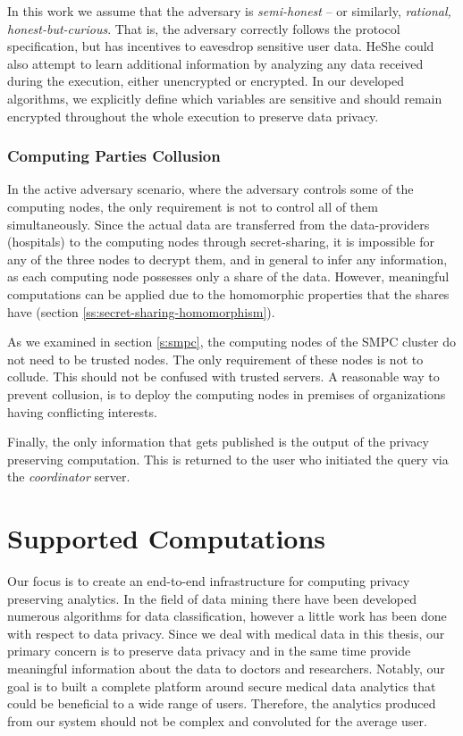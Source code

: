 In this work we assume that the adversary is \emph{semi\hyp honest} -- or similarly, \emph{rational, honest\hyp but\hyp curious}.
That is, the adversary correctly follows the protocol specification, but has incentives to eavesdrop sensitive user data.
He\myslash She could also attempt to learn additional information by analyzing any data received during the execution, either unencrypted or encrypted.
In our developed algorithms, we explicitly define which variables are sensitive and should remain encrypted throughout the whole execution to preserve data privacy.


\subsubsection{Computing Parties Collusion}\label{s:computing-parties-collusion}
In the active adversary scenario, where the adversary controls some of the computing nodes, the only requirement is not to control all of them simultaneously.
Since the actual data are transferred from the data-providers (hospitals) to the computing nodes through secret\hyp sharing, it is impossible for any of the three nodes to decrypt them, and in general to infer any information, as each computing node possesses only a share of the data.
However, meaningful computations can be applied due to the homomorphic properties that the shares have (section \ref{ss:secret-sharing-homomorphism}).

As we examined in section \ref{s:smpc}, the computing nodes of the SMPC cluster do not need to be trusted nodes.
The only requirement of these nodes is not to collude.
This should not be confused with trusted servers.
A reasonable way to prevent collusion, is to deploy the computing nodes in premises of organizations having conflicting interests.

Finally, the only information that gets published is the output of the privacy preserving computation.
This is returned to the user who initiated the query via the \textit{coordinator} server.



\section{Supported Computations}\label{s:computations}
Our focus is to create an end-to-end infrastructure for computing privacy preserving analytics.
In the field of data mining there have been developed numerous algorithms for data classification, however a little work has been done with respect to data privacy.
Since we deal with medical data in this thesis, our primary concern is to preserve data privacy and in the same time provide meaningful information about the data to doctors and researchers.
Notably, our goal is to built a complete platform around secure medical data analytics that could be beneficial to a wide range of users.
Therefore, the analytics produced from our system should not be complex and convoluted for the average user.

